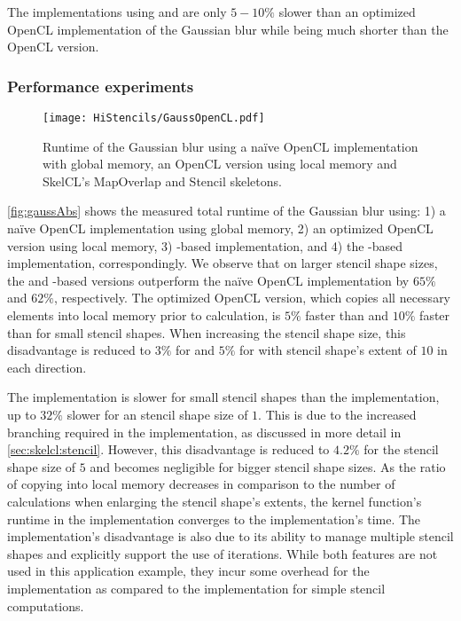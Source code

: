 The implementations using  and  are only $5-10\%$ slower than an optimized OpenCL implementation of the Gaussian blur while being much shorter than the OpenCL version.

\subsubsection*{Performance experiments}

\begin{figure}[tbp]
	\centering
	\texttt{[image: HiStencils/GaussOpenCL.pdf]}
	\caption{Runtime of the Gaussian blur using a na{\"i}ve OpenCL implementation with global memory, an OpenCL version using local memory and SkelCL's MapOverlap and Stencil skeletons.}
	\label{fig:gaussAbs}
\end{figure} 

\autoref{fig:gaussAbs} shows the measured total runtime of the Gaussian blur using:
1) a na{\"i}ve OpenCL implementation using global memory,
2) an optimized OpenCL version using local memory,
3) -based implementation, and
4) the -based implementation, correspondingly.
We observe that on larger stencil shape sizes, the  and -based versions outperform the na{\"i}ve OpenCL implementation by $65\%$ and $62\%$, respectively.
The optimized OpenCL version, which copies all necessary elements into local memory prior to calculation, is $5\%$ faster than  and $10\%$ faster than  for small stencil shapes.
When increasing the stencil shape size, this disadvantage is reduced to $3\%$ for  and $5\%$ for  with stencil shape's extent of $10$ in each direction.

The  implementation is slower for small stencil shapes than the  implementation, up to $32\%$ slower for an stencil shape size of $1$.
This is due to the increased branching required in the  implementation, as discussed in more detail in \autoref{sec:skelcl:stencil}.
However, this disadvantage is reduced to $4.2\%$ for the stencil shape size of $5$ and becomes negligible for bigger stencil shape sizes.
As the ratio of copying into local memory decreases in comparison to the number of calculations when enlarging the stencil shape's extents, the kernel function's runtime in the  implementation  converges to the  implementation's time.
The  implementation's disadvantage is also due to its ability to manage multiple stencil shapes and explicitly support the use of iterations.
While both features are not used in this application example, they incur some overhead for the implementation as compared to the  implementation for simple stencil computations.


